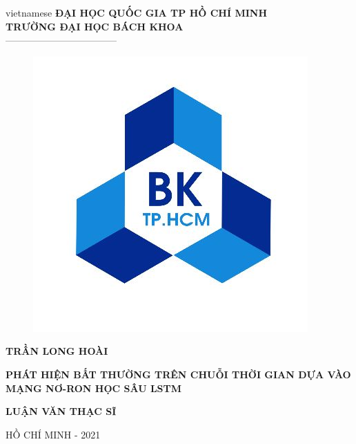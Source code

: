 \begin{titlepage}
\begin{center}

\vspace*{3\bigskipamount}

\begin{otherlanguage*}{vietnamese}
\makeatletter
\fontsize{12}{12}\textbf{ĐẠI HỌC QUỐC GIA TP HỒ CHÍ MINH}\\
\fontsize{14}{14}\textbf{TRƯỜNG ĐẠI HỌC BÁCH KHOA}\\
\fontsize{14}{14} -----------------------------------
\makeatother

\begin{figure}[h]
	\centering
		\includegraphics[width=0.4\columnwidth]{./title/bach_khoa.jpeg}
		\centering
	\label{fig:logo}
\end{figure}

{\makeatletter
\fontsize{16}{16}\textbf{TRẦN LONG HOÀI}\\
\makeatother}

\vspace{1.2cm}

{\makeatletter
\fontsize{18}{18}\textbf{PHÁT HIỆN BẤT THƯỜNG TRÊN CHUỖI THỜI GIAN DỰA VÀO MẠNG NƠ-RON HỌC SÂU LSTM}\\
\makeatother}

\vspace{1.2cm}
{\makeatletter
\fontsize{18}{18}\textbf{LUẬN VĂN THẠC SĨ}\\
\makeatother}


\vspace{7cm}
{\makeatletter
\fontsize{12}{12} HỒ CHÍ MINH - 2021\\
\makeatother}

\end{otherlanguage*}

\end{center}
\end{titlepage}

